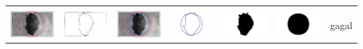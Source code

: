 \begin{table}[H]
\begin{tabular}{|m{0.7in}|m{0.7in}|m{0.7in}|m{0.7in}|m{0.7in}|m{0.7in}|m{0.7in}|}
		&  &  & & & &  \\
		\includegraphics[width=0.7in]{dataset/dataset_3/luka_hitam/ready/15_integer_init.jpg}&
		\includegraphics[width=0.7in]{dataset/dataset_3/luka_hitam/ready/15_integer_ext.jpg}&
		\includegraphics[width=0.7in]{dataset/dataset_3/luka_hitam/ready/15_integer_result.jpg}&
		\includegraphics[width=0.7in]{dataset/dataset_3/luka_hitam/ready/15_gt_r_integer.jpg}&
		\includegraphics[width=0.7in]{dataset/dataset_3/luka_hitam/ready/15_r.jpg}&
		\includegraphics[width=0.7in]{dataset/dataset_3/luka_hitam/ready/15_integer_r.jpg}&
		gagal\\
		\hline
		

\end{tabular}
\end{table}
